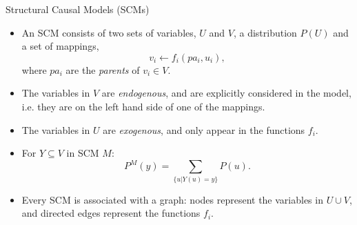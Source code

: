 \begin{frame}{Structural Causal Models (SCMs)}
    \begin{itemize}
        \item An SCM consists of two sets of variables, $U$ and $V$, a distribution $P(U)$ and a set of mappings,
        \begin{equation*}
            v_i \leftarrow f_i(pa_i, u_i),
        \end{equation*}
        where $pa_i$ are the \emph{parents} of $v_i \in V$.
        \item The variables in $V$ are \emph{endogenous}, and are explicitly considered in the model, i.e. they are on the left hand side of one of the mappings.
        \item The variables in $U$ are \emph{exogenous}, and only appear in the functions $f_i$.
        \item For $Y \subseteq V$ in SCM $M$:
        \begin{equation*}
            P^M(y) = \sum_{\{u | Y(u) = y\}}P(u).
        \end{equation*}
        \item Every SCM is associated with a graph: nodes represent the variables in $U \cup V$, and directed edges represent the functions $f_i$.
    \end{itemize}
\end{frame}



